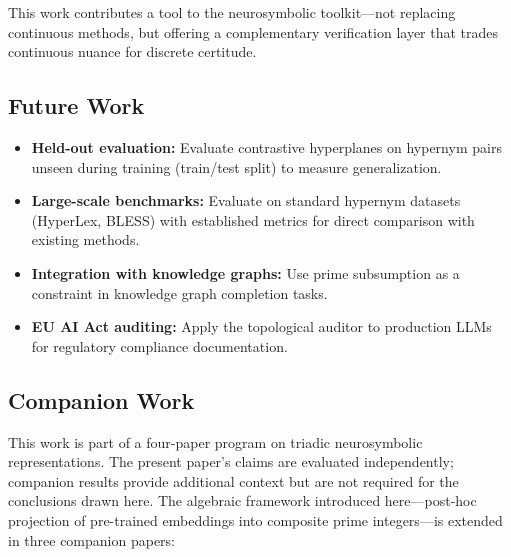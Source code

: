 \documentclass[10pt]{article}
\begin{document}
This work contributes a tool to the neurosymbolic toolkit---not replacing continuous methods, but offering a complementary verification layer that trades continuous nuance for discrete certitude.

\subsection{Future Work}

\begin{itemize}[nosep, leftmargin=*]
    \item \textbf{Held-out evaluation:} Evaluate contrastive hyperplanes on hypernym pairs unseen during training (train/test split) to measure generalization.
    \item \textbf{Large-scale benchmarks:} Evaluate on standard hypernym datasets (HyperLex, BLESS) with established metrics for direct comparison with existing methods.
    \item \textbf{Integration with knowledge graphs:} Use prime subsumption as a constraint in knowledge graph completion tasks.
    \item \textbf{EU AI Act auditing:} Apply the topological auditor to production LLMs for regulatory compliance documentation.
\end{itemize}

\subsection{Companion Work}

This work is part of a four-paper program on triadic neurosymbolic representations. The present paper's claims are evaluated independently; companion results provide additional context but are not required for the conclusions drawn here.
The algebraic framework introduced here---post-hoc projection of pre-trained embeddings into composite prime integers---is extended in three companion papers:
\end{document}
